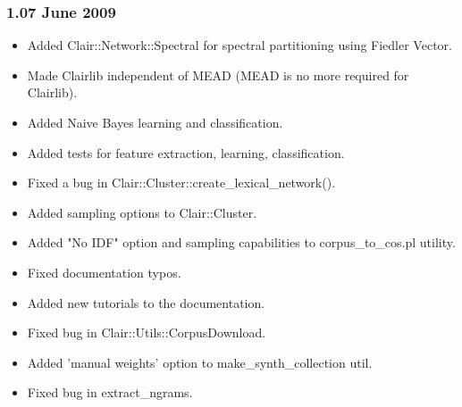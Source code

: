 \subsubsection*{1.07 June 2009\label{1_07_June_2009}}
\begin{itemize}

\item 

Added Clair::Network::Spectral for spectral partitioning using Fiedler Vector.


\item 

Made Clairlib independent of MEAD (MEAD is no more required for Clairlib).


\item 

Added Naive Bayes learning and classification.


\item 

Added tests for feature extraction, learning, classification.


\item 

Fixed a bug in Clair::Cluster::create\_lexical\_network().


\item 

Added sampling options to Clair::Cluster.


\item 

Added "No IDF" option and sampling capabilities to corpus\_to\_cos.pl utility.


\item 

Fixed documentation typos.


\item 

Added new tutorials to the documentation.


\item 

Fixed bug in Clair::Utils::CorpusDownload.


\item 

Added 'manual weights' option to make\_synth\_collection util.


\item 

Fixed bug in extract\_ngrams.

\end{itemize}
